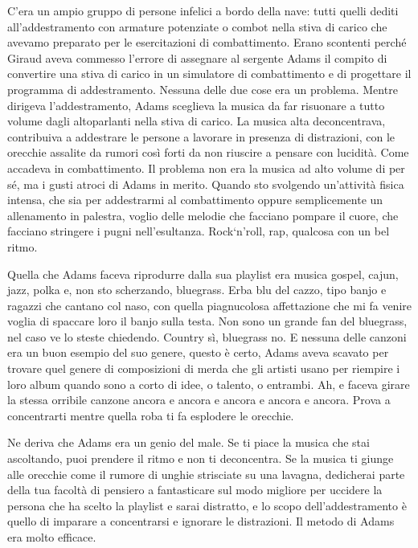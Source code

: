 C'era un ampio gruppo di persone infelici a bordo della nave: tutti
quelli dediti all'addestramento con armature potenziate o combot nella
stiva di carico che avevamo preparato per le esercitazioni di
combattimento. Erano scontenti perché Giraud aveva commesso l'errore di
assegnare al sergente Adams il compito di convertire una stiva di carico
in un simulatore di combattimento e di progettare il programma di
addestramento. Nessuna delle due cose era un problema. Mentre dirigeva
l'addestramento, Adams sceglieva la musica da far risuonare a tutto
volume dagli altoparlanti nella stiva di carico. La musica alta
deconcentrava, contribuiva a addestrare le persone a lavorare in
presenza di distrazioni, con le orecchie assalite da rumori così forti
da non riuscire a pensare con lucidità. Come accadeva in combattimento.
Il problema non era la musica ad alto volume di per sé, ma i gusti
atroci di Adams in merito. Quando sto svolgendo un'attività fisica
intensa, che sia per addestrarmi al combattimento oppure semplicemente
un allenamento in palestra, voglio delle melodie che facciano pompare il
cuore, che facciano stringere i pugni nell'esultanza. Rock`n'roll, rap,
qualcosa con un bel ritmo.

Quella che Adams faceva riprodurre dalla sua playlist era musica gospel,
cajun, jazz, polka e, non sto scherzando, bluegrass. Erba blu del cazzo,
tipo banjo e ragazzi che cantano col naso, con quella piagnucolosa
affettazione che mi fa venire voglia di spaccare loro il banjo sulla
testa. Non sono un grande fan del bluegrass, nel caso ve lo steste
chiedendo. Country sì, bluegrass no. E nessuna delle canzoni era un buon
esempio del suo genere, questo è certo, Adams aveva scavato per trovare
quel genere di composizioni di merda che gli artisti usano per riempire
i loro album quando sono a corto di idee, o talento, o entrambi. Ah, e
faceva girare la stessa orribile canzone ancora e ancora e ancora e
ancora e ancora. Prova a concentrarti mentre quella roba ti fa esplodere
le orecchie.

Ne deriva che Adams era un genio del male. Se ti piace la musica che
stai ascoltando, puoi prendere il ritmo e non ti deconcentra. Se la
musica ti giunge alle orecchie come il rumore di unghie strisciate su
una lavagna, dedicherai parte della tua facoltà di pensiero a
fantasticare sul modo migliore per uccidere la persona che ha scelto la
playlist e sarai distratto, e lo scopo dell'addestramento è quello di
imparare a concentrarsi e ignorare le distrazioni. Il metodo di Adams
era molto efficace.

